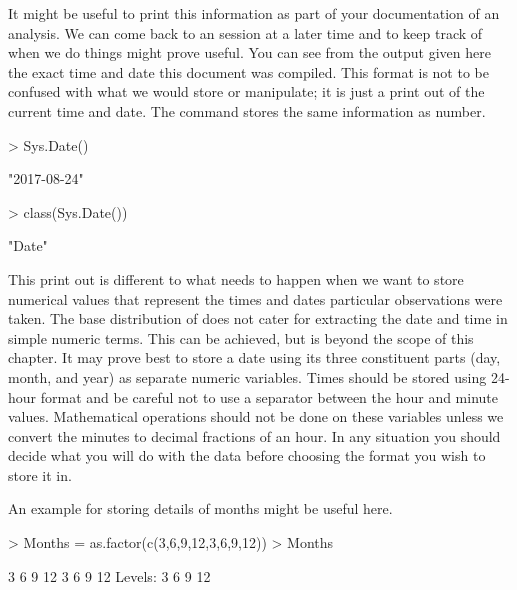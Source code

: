 It might be useful to print this information as part of your documentation of an analysis. We can come back to an \R{} session at a later time and to keep track of when we do things might prove useful. You can see from the output given here the exact time and date this document was compiled. This format is not to be confused with what we would store or manipulate; it is just a print out of the current time and date. The  command stores the same information as number. 

\begin{Schunk}
\begin{Sinput}
> Sys.Date() 
\end{Sinput}
\begin{Soutput}
[1] "2017-08-24"
\end{Soutput}
\begin{Sinput}
> class(Sys.Date()) 
\end{Sinput}
\begin{Soutput}
[1] "Date"
\end{Soutput}
\end{Schunk}

 
This print out is different to what needs to happen when we want to store numerical values that represent the times and dates particular observations were taken. The base distribution of \R{} does not cater for extracting the date and time in simple numeric terms. This can be achieved, but is beyond the scope of this chapter. It may prove best to store a date using its three constituent parts (day, month, and year) as separate numeric variables. Times should be stored using 24-hour format and be careful not to use a separator between the hour and minute values. Mathematical operations should not be done on these variables unless we convert the minutes to decimal fractions of an hour. In any situation you should decide what you will do with the data before choosing the format you wish to store it in. 
 
An example for storing details of months might be useful here. 

\begin{Schunk}
\begin{Sinput}
> Months = as.factor(c(3,6,9,12,3,6,9,12)) 
> Months 
\end{Sinput}
\begin{Soutput}
[1] 3  6  9  12 3  6  9  12
Levels: 3 6 9 12
\end{Soutput}
\end{Schunk}

